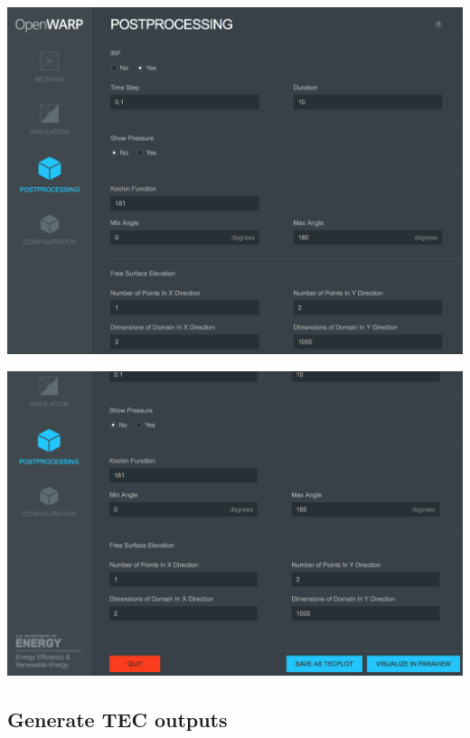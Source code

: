 \documentclass[12pt]{article}
\begin{document}
\vspace{\abovedisplayskip}
\begin{minipage}{\linewidth}
	\centering
	\includegraphics[scale=0.4]{img/34}
\end{minipage}
\begin{minipage}{\linewidth}
	\centering
	\includegraphics[scale=0.4]{img/35}
\end{minipage}



\subsection{Generate TEC outputs}
\end{document}
